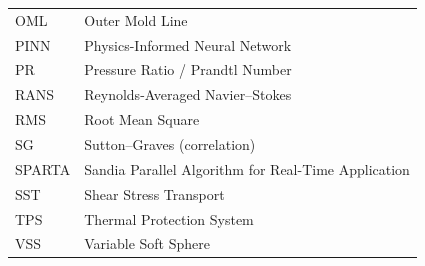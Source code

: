 \begin{center}
\begin{tabularx}{0.8\textwidth} { 
   >{\raggedright\arraybackslash}X 
   >{\raggedright\arraybackslash}X}
    OML         & Outer Mold Line                        \\
    PINN        & Physics-Informed Neural Network        \\
    PR          & Pressure Ratio / Prandtl Number        \\
    RANS        & Reynolds-Averaged Navier--Stokes       \\
    RMS         & Root Mean Square                       \\
    SG          & Sutton--Graves (correlation)           \\
    SPARTA      & Sandia Parallel Algorithm for Real-Time Application \\
    SST         & Shear Stress Transport                 \\
    TPS         & Thermal Protection System              \\
    VSS         & Variable Soft Sphere                   \\
    \hline
\end{tabularx}
\end{center}
